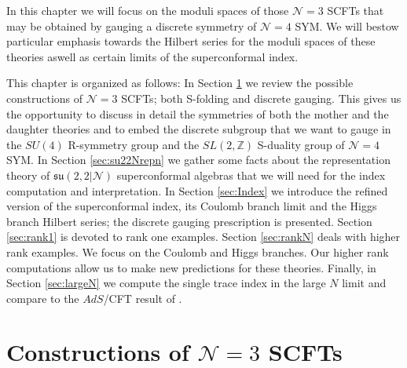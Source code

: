 \documentclass[main.tex]{subfiles}
\begin{document}
In this chapter we will focus on the moduli spaces of those $\mathcal{N}=3$ SCFTs that may be obtained by gauging a discrete symmetry of $\mathcal{N}=4$ SYM. We will bestow particular emphasis towards the Hilbert series for the moduli spaces of these theories aswell as certain limits of the superconformal index. 

This chapter is organized as follows: In Section \ref{sec:N3Cons} we review the possible constructions of $\mathcal{N}=3$ SCFTs; both S-folding and discrete gauging. This gives us the opportunity to discuss in detail the symmetries of both the mother and the daughter theories and to embed the discrete subgroup that we want to gauge in the $SU(4)$ R-symmetry group and the $SL(2,\mathbb{Z})$ S-duality group of $\mathcal{N}=4$ SYM. 
In Section \ref{sec:su22Nrepn} we gather some facts about the representation theory of $\mathfrak{su}(2,2|\mathcal{N})$ superconformal algebras that we will need for the index computation and interpretation.
In Section \ref{sec:Index} we introduce the refined version of the superconformal index, its Coulomb branch limit and the Higgs branch Hilbert series; the discrete gauging prescription is presented.
Section \ref{sec:rank1} is devoted to rank one examples. 
Section \ref{sec:rankN} deals with higher rank examples. We focus on the Coulomb and Higgs branches. Our higher rank computations allow us to make new predictions for these theories. 
Finally, in Section \ref{sec:largeN} we compute the single trace index in the large $N$ limit and compare to the $AdS$/CFT result of \cite{Imamura:2016abe}.

\section{Constructions of \texorpdfstring{$\mathcal{N}=3$}{N=3} SCFTs}\label{sec:N3Cons}
\end{document}
